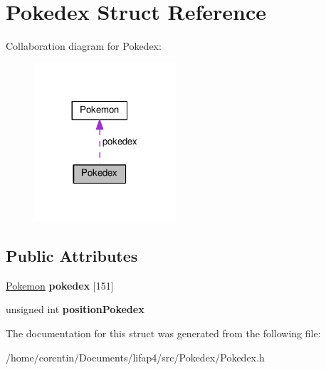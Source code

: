 \hypertarget{struct_pokedex}{}\section{Pokedex Struct Reference}
\label{struct_pokedex}


Collaboration diagram for Pokedex\+:
\nopagebreak
\begin{figure}[H]
\begin{center}
\leavevmode
\includegraphics[width=149pt]{struct_pokedex__coll__graph}
\end{center}
\end{figure}
\subsection*{Public Attributes}
\begin{DoxyCompactItemize}
\item 
\mbox{\label{struct_pokedex_a830f41515021f320a1f667e11f539451}} 
\hyperlink{class_pokemon}{Pokemon} {\bfseries pokedex} \mbox{[}151\mbox{]}
\item 
\mbox{\label{struct_pokedex_aa1b524976debf20743a34e598b0ab00d}} 
unsigned int {\bfseries position\+Pokedex}
\end{DoxyCompactItemize}


The documentation for this struct was generated from the following file\+:\begin{DoxyCompactItemize}
\item 
/home/corentin/\+Documents/lifap4/src/\+Pokedex/Pokedex.\+h\end{DoxyCompactItemize}
